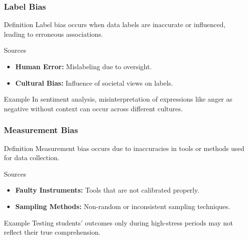 \documentclass[aspectratio=169]{beamer}
\begin{document}
\begin{frame}[fragile]
    \frametitle{Label Bias}
    \begin{block}{Definition}
        Label bias occurs when data labels are inaccurate or influenced, leading to erroneous associations.
    \end{block}
    \begin{block}{Sources}
        \begin{itemize}
            \item \textbf{Human Error:} Mislabeling due to oversight.
            \item \textbf{Cultural Bias:} Influence of societal views on labels.
        \end{itemize}
    \end{block}
    \begin{block}{Example}
        In sentiment analysis, misinterpretation of expressions like anger as negative without context can occur across different cultures.
    \end{block}
\end{frame}

\begin{frame}[fragile]
    \frametitle{Measurement Bias}
    \begin{block}{Definition}
        Measurement bias occurs due to inaccuracies in tools or methods used for data collection.
    \end{block}
    \begin{block}{Sources}
        \begin{itemize}
            \item \textbf{Faulty Instruments:} Tools that are not calibrated properly.
            \item \textbf{Sampling Methods:} Non-random or inconsistent sampling techniques.
        \end{itemize}
    \end{block}
    \begin{block}{Example}
        Testing students’ outcomes only during high-stress periods may not reflect their true comprehension.
    \end{block}
\end{frame}
\end{document}
